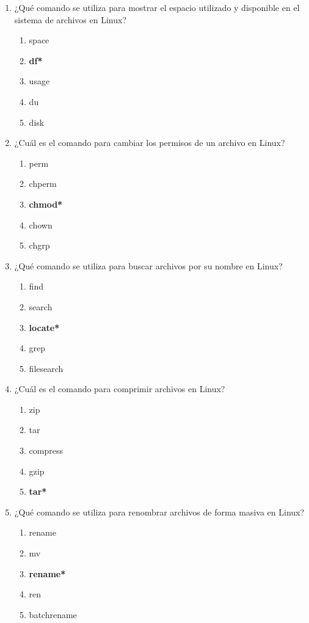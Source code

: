 \documentclass[11pt,twoside]{book}
\begin{document}
\begin{enumerate}[label=\textbf{\arabic*.}, leftmargin=2cm]
    \item ¿Qué comando se utiliza para mostrar el espacio utilizado y disponible en el sistema de archivos en Linux?
    \begin{enumerate}[label=\Alph*.]
        \item space
        \item \textbf{df*}
        \item usage
        \item du
        \item disk
    \end{enumerate}

    \item ¿Cuál es el comando para cambiar los permisos de un archivo en Linux?
    \begin{enumerate}[label=\Alph*.]
        \item perm
        \item chperm
        \item \textbf{chmod*}
        \item chown
        \item chgrp
    \end{enumerate}

    \item ¿Qué comando se utiliza para buscar archivos por su nombre en Linux?
    \begin{enumerate}[label=\Alph*.]
        \item find
        \item search
        \item \textbf{locate*}
        \item grep
        \item filesearch
    \end{enumerate}

    \item ¿Cuál es el comando para comprimir archivos en Linux?
    \begin{enumerate}[label=\Alph*.]
        \item zip
        \item tar
        \item compress
        \item gzip
        \item \textbf{tar*}
    \end{enumerate}

    \item ¿Qué comando se utiliza para renombrar archivos de forma masiva en Linux?
    \begin{enumerate}[label=\Alph*.]
        \item rename
        \item mv
        \item \textbf{rename*}
        \item ren
        \item batchrename
    \end{enumerate}


\end{enumerate}
\end{document}
